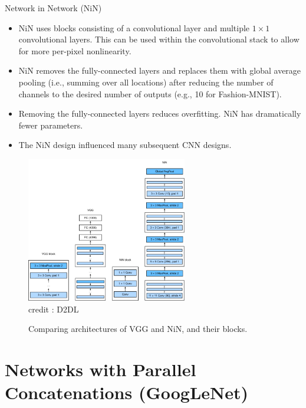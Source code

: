 \begin{vbframe}{Network in Network (NiN)}
  \begin{itemize}
    \item NiN uses blocks consisting of a convolutional layer and multiple $1 \times 1$ convolutional layers. This can be used within the convolutional stack to allow for more per-pixel nonlinearity.
    \item NiN removes the fully-connected layers and replaces them with global average pooling (i.e., summing over all locations) after reducing the number of channels to the desired number of outputs (e.g., 10 for Fashion-MNIST).
    \item Removing the fully-connected layers reduces overfitting. NiN has dramatically fewer parameters.
    \item The NiN design influenced many subsequent CNN designs.
  \end{itemize}
\framebreak
  \begin{figure}
  \centering
    \includegraphics[width=7cm]{plots/moderncnn/nin.png}
    \tiny{\\ credit : D2DL}
    \caption{Comparing architectures of VGG and NiN, and their blocks.}
  \end{figure}

\end{vbframe}

\section{Networks with Parallel Concatenations (GoogLeNet)}


